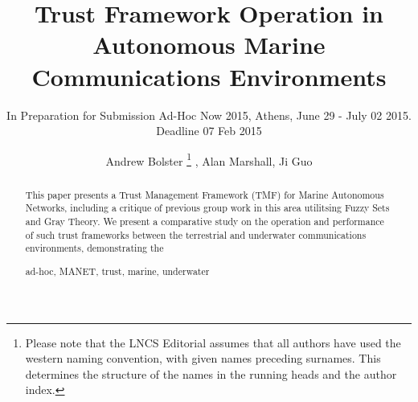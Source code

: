 \documentclass[runningheads,a4paper]{llncs}
\newcommand{\keywords}[1]{\par\addvspace\baselineskip
\noindent\keywordname\enspace\ignorespaces#1}
\begin{document}
\mainmatter  %

\title{Trust Framework Operation in Autonomous Marine Communications Environments}
\subtitle{In Preparation for Submission Ad-Hoc Now 2015, Athens, June 29 - July 02 2015. Deadline 07 Feb 2015}


%
%
\author{Andrew Bolster%
\thanks{Please note that the LNCS Editorial assumes that all authors have used
the western naming convention, with given names preceding surnames. This determines
the structure of the names in the running heads and the author index.}
, Alan Marshall, Ji Guo}
%


\maketitle


\begin{abstract}

  This paper presents a Trust Management Framework (TMF) for Marine Autonomous Networks, including a critique of previous group work in this area utilitsing Fuzzy Sets and Gray Theory.
  We present a comparative study on the operation and performance of such trust frameworks between the terrestrial and underwater communications environments, demonstrating the 
\keywords{ad-hoc, MANET, trust, marine, underwater}
\end{abstract}
\end{document}
